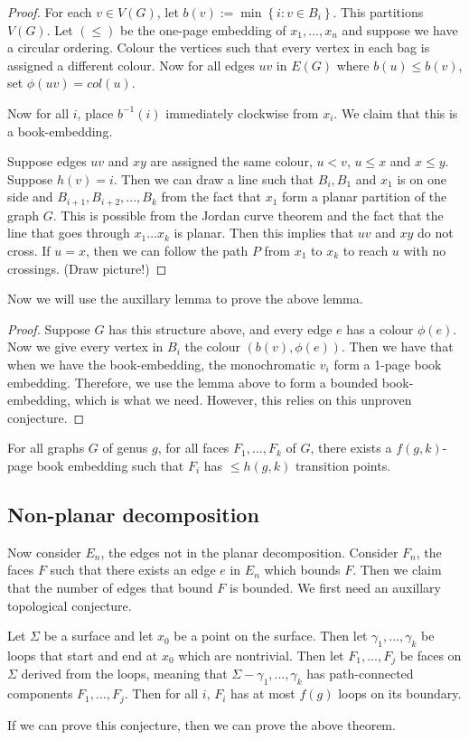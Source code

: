 \begin{proof}
	For each $v \in V(G)$, let $b(v) := \min \left\{ i : v \in B_i \right\}$. This partitions $V(G)$. Let $(\leq)$ be the one-page embedding of $x_1, ..., x_n$ and suppose we have a circular ordering. Colour the vertices such that every vertex in each bag is assigned a different colour. Now for all edges $uv$ in $E(G)$ where $b(u) \leq b(v) $, set $\phi(uv) = col(u)$. 
	
	Now for all $i$, place $b^{-1}(i)$ immediately clockwise from $x_i$. We claim that this is a book-embedding. 
	
	Suppose edges $uv$ and $xy$ are assigned the same colour, $u < v$, $u \leq x$ and $x \leq y$. Suppose $h(v) = i$. Then we can draw a line such that $B_i, B_1$ and $x_1$ is on one side and $B_{i + 1}, B_{i + 2}, ..., B_k$ from the fact that $x_1$ form a planar partition of the graph $G$. This is possible from the Jordan curve theorem and the fact that the line that goes through $x_1 ... x_k$ is planar. Then this implies that $uv$ and $xy$ do not cross. 
	If $u = x$, then we can follow the path $P$ from $x_1$ to $x_k$ to reach $u$ with no crossings. (Draw picture!)
\end{proof}

Now we will use the auxillary lemma to prove the above lemma.
\begin{proof}
	Suppose $G$ has this structure above, and every edge $e$ has a colour $\phi(e)$. 
	Now we give every vertex in $B_i$ the colour $(b(v),  \phi(e))$. Then we have that when we have the book-embedding, the monochromatic $v_i$ form a 1-page book embedding. Therefore, we use the lemma above to form a bounded book-embedding, which is what we need. However, this relies on this unproven conjecture.
\end{proof}

\begin{conjecture}
	For all graphs $G$ of genus $g$, for all faces $F_1, ..., F_k$ of $G$, there exists a $f(g, k)$-page book embedding such that $F_i$ has $\leq h(g, k)$ transition points. 
\end{conjecture}

\subsection{Non-planar decomposition}
Now consider $E_n$, the edges not in the planar decomposition. Consider $F_n$, the faces $F$ such that there exists an edge $e$ in $E_n$ which bounds $F$. Then we claim that the number of edges that bound $F$ is bounded. We first need an auxillary topological conjecture. 

\begin{conjecture}
	Let $\Sigma$ be a surface and let $x_0$ be a point on the surface. Then let $\gamma_1, ..., \gamma_k$ be loops that start and end at $x_0$ which are nontrivial. Then let $F_1, ..., F_j$ be faces on $\Sigma$ derived from the loops, meaning that $\Sigma - \gamma_1, ..., \gamma_k$ has path-connected components $F_1, ..., F_j$. Then for all $i$, $F_i$ has at most $f(g)$ loops on its boundary.
\end{conjecture}

If we can prove this conjecture, then we can prove the above theorem. 


